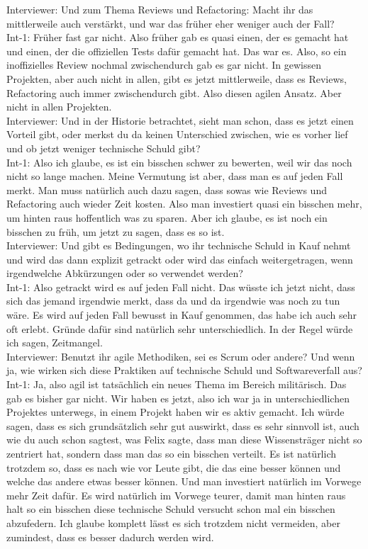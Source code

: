 Interviewer: Und zum Thema Reviews und Refactoring: Macht ihr das mittlerweile auch verstärkt, und war das früher eher weniger auch der Fall?\\
Int-1: Früher fast gar nicht. Also früher gab es quasi einen, der es gemacht hat und einen, der die offiziellen Tests dafür gemacht hat. Das war es. Also, so ein inoffizielles Review nochmal zwischendurch gab es gar nicht. In gewissen Projekten, aber auch nicht in allen, gibt es jetzt mittlerweile, dass es Reviews, Refactoring auch immer zwischendurch gibt. Also diesen agilen Ansatz. Aber nicht in allen Projekten.\\
Interviewer: Und in der Historie betrachtet, sieht man schon, dass es jetzt einen Vorteil gibt, oder merkst du da keinen Unterschied zwischen, wie es vorher lief und ob jetzt weniger technische Schuld gibt?\\
Int-1: Also ich glaube, es ist ein bisschen schwer zu bewerten, weil wir das noch nicht so lange machen. Meine Vermutung ist aber, dass man es auf jeden Fall merkt. Man muss natürlich auch dazu sagen, dass sowas wie Reviews und Refactoring auch wieder Zeit kosten. Also man investiert quasi ein bisschen mehr, um hinten raus hoffentlich was zu sparen. Aber ich glaube, es ist noch ein bisschen zu früh, um jetzt zu sagen, dass es so ist.\\
Interviewer: Und gibt es Bedingungen, wo ihr technische Schuld in Kauf nehmt und wird das dann explizit getrackt oder wird das einfach weitergetragen, wenn irgendwelche Abkürzungen oder so verwendet werden?\\
Int-1: Also getrackt wird es auf jeden Fall nicht. Das wüsste ich jetzt nicht, dass sich das jemand irgendwie merkt, dass da und da irgendwie was noch zu tun wäre. Es wird auf jeden Fall bewusst in Kauf genommen, das habe ich auch sehr oft erlebt. Gründe dafür sind natürlich sehr unterschiedlich. In der Regel würde ich sagen, Zeitmangel.\\
Interviewer: Benutzt ihr agile Methodiken, sei es Scrum oder andere? Und wenn ja, wie wirken sich diese Praktiken auf technische Schuld und Softwareverfall aus?\\
Int-1: Ja, also agil ist tatsächlich ein neues Thema im Bereich militärisch. Das gab es bisher gar nicht. Wir haben es jetzt, also ich war ja in unterschiedlichen Projektes unterwegs, in einem Projekt haben wir es aktiv gemacht. Ich würde sagen, dass es sich grundsätzlich sehr gut auswirkt, dass es sehr sinnvoll ist, auch wie du auch schon sagtest, was Felix sagte, dass man diese Wissensträger nicht so zentriert hat, sondern dass man das so ein bisschen verteilt. Es ist natürlich trotzdem so, dass es nach wie vor Leute gibt, die das eine besser können und welche das andere etwas besser können. Und man investiert natürlich im Vorwege mehr Zeit dafür. Es wird natürlich im Vorwege teurer, damit man hinten raus halt so ein bisschen diese technische Schuld versucht schon mal ein bisschen abzufedern. Ich glaube komplett lässt es sich trotzdem nicht vermeiden, aber zumindest, dass es besser dadurch werden wird.\\
